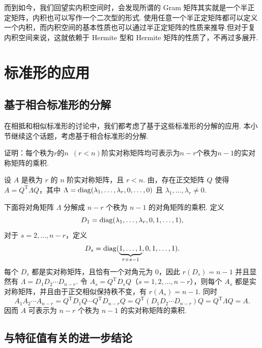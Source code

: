 而到如今，我们回望实内积空间时，会发现所谓的 Gram 矩阵其实就是一个半正定矩阵，内积也可以写作一个二次型的形式. 使用任意一个半正定矩阵都可以定义一个内积，而内积空间的基本性质也可以通过半正定矩阵的性质来推导.但对于复内积空间来说，这就依赖于 Hermite 型和 Hermite 矩阵的性质了，不再过多展开.

\section{标准形的应用}

\subsection{基于相合标准形的分解}

在相抵和相似标准形的讨论中，我们都考虑了基于这些标准形的分解的应用. 本小节继续这个话题，考虑基于相合标准形的分解.

\begin{example}{}{}
    证明：每个秩为$r$的$n\enspace(r<n)$阶实对称矩阵均可表示为$n-r$个秩为$n-1$的实对称矩阵的乘积.
\end{example}

\begin{solution}
    设 $A$ 是秩为 $r$ 的 $n$ 阶实对称矩阵，且 $r<n$. 由，存在正交矩阵 $Q$ 使得 $A=Q^\mathrm{T}\Lambda Q$，其中 $\Lambda=\operatorname{diag}(\lambda_1,\ldots,\lambda_r,0,\ldots,0)$ 且 $\lambda_1,\ldots,\lambda_r\neq 0$.

    下面将对角矩阵 $\Lambda$ 分解成 $n-r$ 个秩为 $n-1$ 的对角矩阵的乘积. 定义
    \[
        D_1=\operatorname{diag}(\lambda_1,\ldots,\lambda_r,0,1,\ldots,1),
    \]
    对于 $s=2,\ldots,n-r$，定义
    \[
        D_s=\operatorname{diag}(\underbrace{1,\ldots,1}_{r+s-1},0,1,\ldots,1).
    \]
    每个 $D_s$ 都是实对称矩阵，且恰有一个对角元为 $0$，因此 $r(D_s)=n-1$ 并且显然有 $\Lambda=D_1D_2\cdots D_{n-r}$. 令 $A_s=Q^\mathrm{T}D_sQ$（$s=1,2,\ldots,n-r$），则每个 $A_s$ 都是实对称矩阵，并且由于正交相似保持秩不变，有 $r(A_s)=n-1$. 同时
    \[
        A_1A_2\cdots A_{n-r}
        =Q^\mathrm{T}D_1Q\cdots Q^\mathrm{T}D_{n-r}Q
        =Q^\mathrm{T}(D_1D_2\cdots D_{n-r})Q
        =Q^\mathrm{T}\Lambda Q
        =A.
    \]
    因而 $A$ 可表示为 $n-r$ 个秩为 $n-1$ 的实对称矩阵的乘积.
\end{solution}

\subsection{与特征值有关的进一步结论}

